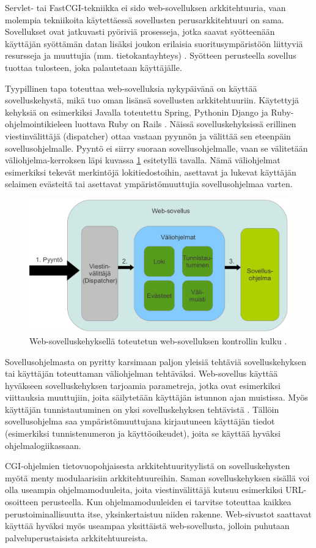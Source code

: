 Servlet- tai FastCGI-tekniikka ei sido web-sovelluksen arkkitehtuuria, vaan molempia tekniikoita käytettäessä sovellusten perusarkkitehtuuri on sama. Sovellukset ovat jatkuvasti pyöriviä prosesseja, jotka saavat syötteenään käyttäjän syöttämän datan lisäksi joukon erilaisia suoritusympäristöön liittyviä resursseja ja muuttujia (mm. tietokantayhteys) \cite{uml}. Syötteen perusteella sovellus tuottaa tulosteen, joka palautetaan käyttäjälle.

Tyypillinen tapa toteuttaa web-sovelluksia nykypäivänä on käyttää sovelluskehystä, mikä tuo oman lisänsä sovellusten arkkitehtuuriin. Käytettyjä kehyksiä on esimerkiksi Javalla toteutettu Spring, Pythonin Django ja Ruby-ohjelmointikieleen luottava Ruby on Rails \cite{spring, django, ruby2011agile}. Näissä sovelluskehyksissä erillinen viestinvälittäjä (dispatcher) ottaa vastaan pyynnön ja välittää sen eteenpäin sovellusohjelmalle. Pyyntö ei siirry suoraan sovellusohjelmalle, vaan se välitetään väliohjelma-kerroksen läpi kuvassa \ref{dispatcher} esitetyllä tavalla. Nämä väliohjelmat esimerkiksi tekevät merkintöjä lokitiedostoihin, asettavat ja lukevat käyttäjän selaimen evästeitä tai asettavat ympäristömuuttujia sovellusohjelmaa varten.

\begin{figure}[ht]
\centering
\includegraphics[width=\textwidth]{web/dispatcher.eps}
\caption{Web-sovelluskehyksellä toteutetun web-sovelluksen kontrollin kulku \cite{ruby2011agile}.}%
\label{dispatcher}
\end{figure}

Sovellusohjelmasta on pyritty karsimaan paljon yleisiä tehtäviä sovelluskehyksen tai käyttäjän toteuttaman väliohjelman tehtäväksi. Web-sovellus käyttää hyväkseen sovelluskehyksen tarjoamia parametreja, jotka ovat esimerkiksi viittauksia muuttujiin, joita säilytetään käyttäjän istunnon ajan muistissa. Myös käyttäjän tunnistautuminen on yksi sovelluskehyksen tehtävistä \cite{ruby2011agile}. Tällöin sovellusohjelma saa ympäristömuuttujana kirjautuneen käyttäjän tiedot (esimerkiksi tunnistenumeron ja käyttöoikeudet), joita se käyttää hyväksi ohjelmalogiikassaan.

CGI-ohjelmien tietovuopohjaisesta arkkitehtuurityylistä on sovelluskehysten myötä menty modulaarisiin arkkitehtuureihin. Saman sovelluskehyksen sisällä voi olla useampia ohjelmamoduuleita, joita viestinvälittäjä kutsuu esimerkiksi URL-osoitteen perusteella. Kun ohjelmamoduuleiden ei tarvitse toteuttaa kaikkea perustoiminallisuutta itse, yksinkertaistuu niiden rakenne. Web-sivustot saattavat käyttää hyväksi myös useampaa yksittäistä web-sovellusta, jolloin puhutaan palveluperustaisista arkkitehtuureista.